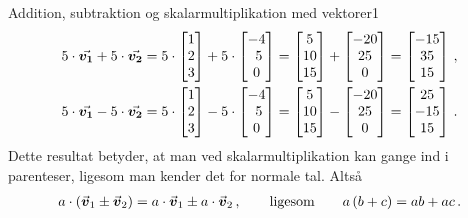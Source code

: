 \begin{opgave}{Addition, subtraktion og skalarmultiplikation med vektorer}{1}
\begin{align*}
	5\cdot{\vec{\boldsymbol{v_1}}} + 5\cdot{\vec{\boldsymbol{v_2}}} &= 5\cdot \begin{bmatrix} 1 \\ 2 \\ 3 \end{bmatrix} + 5\cdot \begin{bmatrix} -4 \\\ 5 \\ 0 \end{bmatrix} = \begin{bmatrix} 5 \\ 10 \\ 15 \end{bmatrix} + \begin{bmatrix} -20 \\ 25 \\ 0 \end{bmatrix} = \begin{bmatrix} -15 \\ 35 \\ 15 \end{bmatrix} \, , \\
	5\cdot{\vec{\boldsymbol{v_1}}} - 5\cdot{\vec{\boldsymbol{v_2}}} &= 5\cdot \begin{bmatrix} 1 \\ 2 \\ 3 \end{bmatrix} - 5\cdot \begin{bmatrix} -4 \\\ 5 \\ 0 \end{bmatrix} = \begin{bmatrix} 5 \\ 10 \\ 15 \end{bmatrix} - \begin{bmatrix} -20 \\ 25 \\ 0 \end{bmatrix} = \begin{bmatrix} 25 \\ -15 \\ 15 \end{bmatrix} \, .
	\end{align*}
	Dette resultat betyder, at man ved skalarmultiplikation kan gange ind i parenteser, ligesom man kender det for normale tal. Altså
	\begin{align*}
	a\cdot \left( {\vec{\boldsymbol{v}}}_1 \pm {\vec{\boldsymbol{v}}}_2 \right) = a \cdot {\vec{\boldsymbol{v}}}_1 \pm a \cdot {\vec{\boldsymbol{v}}}_2 \, , \qquad \text{ligesom} \qquad a\left(b+c\right) = ab + ac \, .
	\end{align*} 
\end{opgave}

